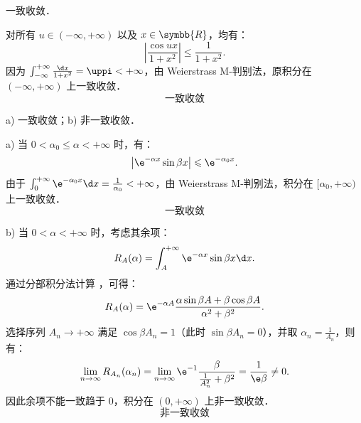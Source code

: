 \begin{solution}
     一致收敛．

    对所有 $u \in (-\infty, +\infty)$ 以及 $x \in \symbb{R}$，均有：
    \begin{equation}
        \left| \frac{\cos ux}{1 + x^2} \right| \leqslant \frac{1}{1 + x^2}.
    \end{equation}
    因为 $\int_{-\infty}^{+\infty} \frac{\d x}{1 + x^2} = \uppi < +\infty$，由 Weierstrass M-判别法，原积分在 $(-\infty, +\infty)$ 上一致收敛．
    \begin{equation}
        \boxed{\text{一致收敛}}
    \end{equation}

     a) 一致收敛；b) 非一致收敛．

    a) 当 $0 < \alpha_0 \leqslant \alpha < +\infty$ 时，有：
    \begin{equation}
        \left| \e^{-\alpha x} \sin \beta x \right| \leqslant \e^{-\alpha_0 x}.
    \end{equation}
    由于 $\int_0^{+\infty} \e^{-\alpha_0 x} \d x = \frac{1}{\alpha_0} < +\infty$，由 Weierstrass M-判别法，积分在 $[\alpha_0, +\infty)$ 上一致收敛．
    \begin{equation}
        \boxed{\text{一致收敛}}
    \end{equation}

    b) 当 $0 < \alpha < +\infty$ 时，考虑其余项：
    \begin{equation}\label{eq:part2-tail}
        R_A(\alpha) = \int_A^{+\infty} \e^{-\alpha x} \sin \beta x \d x.
    \end{equation}
    通过分部积分法计算 ，可得：
    \begin{equation}
        R_A(\alpha) = \e^{-\alpha A} \frac{\alpha \sin \beta A + \beta \cos \beta A}{\alpha^2 + \beta^2}.
    \end{equation}
    选择序列 $A_n \to +\infty$ 满足 $\cos \beta A_n = 1$（此时 $\sin \beta A_n = 0$），并取 $\alpha_n = \frac{1}{A_n}$，则有：
    \begin{equation}
        \lim_{n \to \infty} R_{A_n}(\alpha_n) = \lim_{n \to \infty} \e^{-1} \frac{\beta}{\frac{1}{A_n^2} + \beta^2} = \frac{1}{\e \beta} \neq 0.
    \end{equation}
    因此余项不能一致趋于 $0$，积分在 $(0, +\infty)$ 上非一致收敛．
    \begin{equation}
        \boxed{\text{非一致收敛}}
    \end{equation}


\end{solution}
